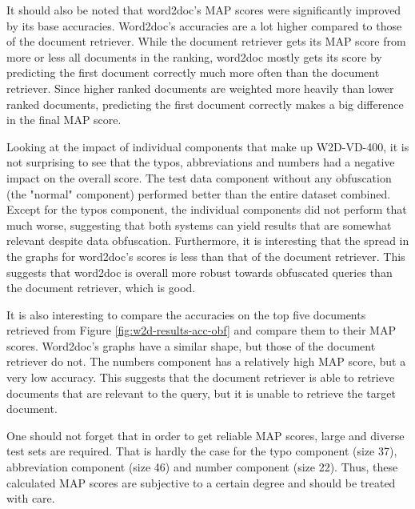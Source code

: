 It should also be noted that word2doc's MAP scores were significantly improved by its base accuracies. Word2doc's accuracies are
a lot higher compared to those of the document retriever. While the document retriever gets its MAP score from more or less all
documents in the ranking, word2doc mostly gets its score by predicting the first document correctly much more often than the
document retriever. Since higher ranked documents are weighted more heavily than lower ranked documents, predicting the first
document correctly makes a big difference in the final MAP score.

Looking at the impact of individual components that make up W2D-VD-400, it is not surprising to see that the typos, abbreviations
and numbers had a negative impact on the overall score. The test data component without any obfuscation (the "normal" component)
performed better than the entire dataset combined. Except for the typos component, the individual components did not perform
that much worse, suggesting that both systems can
yield results that are somewhat relevant despite data obfuscation. Furthermore, it is interesting that the
spread in the graphs for word2doc's scores is less than that of the document retriever. This suggests that word2doc is overall more
robust towards obfuscated queries than the document retriever, which is good.

It is also interesting to compare the accuracies on the top five documents retrieved from Figure \ref{fig:w2d-results-acc-obf} and
compare them to their MAP scores. Word2doc's graphs have a similar shape, but those of the document retriever do not. The numbers
component has a relatively high MAP score, but a very low accuracy. This suggests that the document retriever is able to
retrieve documents that are relevant to the query, but it is unable to retrieve the target document.

One should not forget that in order to get reliable MAP scores, large and diverse test sets are required. That is
hardly the case for the typo component (size 37), abbreviation component (size 46) and number component (size 22).
Thus, these calculated MAP scores are subjective to a certain degree and should be treated with care.

